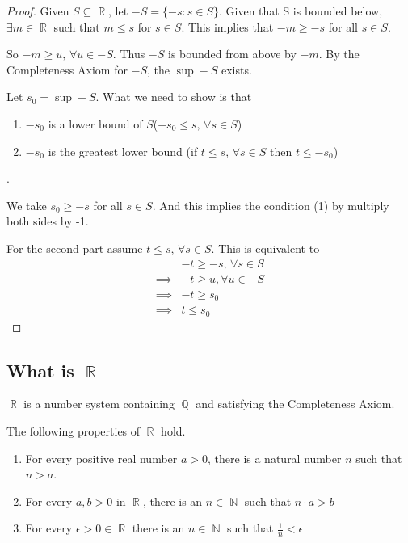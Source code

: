 \documentclass[a4paper, 11pt]{article}
\DeclareMathOperator{\N}{\mathbb{N}}
\DeclareMathOperator{\R}{\mathbb{R}}
\DeclareMathOperator{\Q}{\mathbb{Q}}
\begin{document}
\begin{proof}
Given $S \subseteq \R$, let $-S = \lbrace -s: s \in S \rbrace$. Given that S is bounded below, $\exists m\in \R$
such that $m \leq s$ for $s \in S$. This implies that $-m \geq -s$ for all $s \in S$.

So $-m \geq u, \, \forall u \in -S$. Thus $-S$ is bounded from above by $-m$. By the Completeness Axiom for
$-S$, the $\sup -S$ exists.

Let $s_0 = \sup -S$. What we need to show is that 
\begin{enumerate}
  \item $-s_0$ is a lower bound of $S$($-s_0 \leq s, \, \forall s \in S$)
  \item $-s_0$ is the greatest lower bound (if $t \leq s, \, \forall s \in S$ then $t \leq -s_0$)
\end{enumerate}.

We take $s_0 \geq -s$ for all $s \in S$. And this implies the condition (1) by multiply both sides
by -1.

For the second part assume $t \leq s, \, \forall s \in S$. This is equivalent to 
\begin{align*}
  &-t \geq -s, \, \forall s \in S\\
  \implies &-t \geq u, \forall u \in -S\\
  \implies &-t \geq s_0 \\
  \implies &t \leq s_0
\end{align*}
\end{proof}

\subsection{What is $\R$}
$\R$ is a number system containing $\Q$ and satisfying the Completeness Axiom.

\begin{definition}
The following properties of $\R$ hold.
\begin{enumerate}
  \item For every positive real number $a > 0$, there is a natural number $n$ such that $n > a$.
  \item For every $a, b > 0$ in $\R$, there is an $n \in \N$ such that $n\cdot a > b$
  \item For every $\epsilon > 0 \in \R$ there is an $n \in \N$ such that $\frac{1}{n} < \epsilon$
\end{enumerate}
\end{definition}
\end{document}
